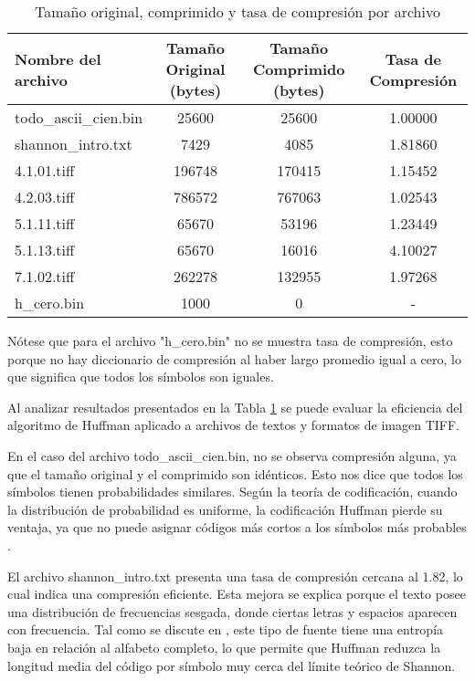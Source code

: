 \documentclass[conference,onecolumn,12pt]{IEEEtran}
\numberwithin{equation}{subsection}
\begin{document}
\begin{table}[H]
    \centering
    \caption{Tamaño original, comprimido y tasa de compresión por archivo}
    \label{tab:compression_stats}
    \begin{tabular}{lccc}
        \toprule
        \textbf{Nombre del archivo} & \textbf{Tamaño Original (bytes)} & \textbf{Tamaño Comprimido (bytes)} & \textbf{Tasa de Compresión} \\
        \midrule
        todo\_ascii\_cien.bin & 25600  & 25600  & 1.00000 \\
        shannon\_intro.txt    & 7429   & 4085   & 1.81860 \\
        4.1.01.tiff 		  & 196748 & 170415 & 1.15452 \\
        4.2.03.tiff 		  & 786572 & 767063 & 1.02543 \\
        5.1.11.tiff			  & 65670  & 53196  & 1.23449 \\
        5.1.13.tiff 	   	  & 65670  & 16016  & 4.10027 \\
        7.1.02.tiff 		  & 262278 & 132955 & 1.97268 \\
        h\_cero.bin 		  & 1000   & 0      & - \\
        \bottomrule 
    \end{tabular}
\end{table}

Nótese que para el archivo "h\_cero.bin" no se muestra tasa de compresión, esto porque no hay diccionario de compresión al haber largo promedio igual a cero, lo que significa que todos los símbolos son iguales.

Al analizar resultados presentados en la Tabla \ref{tab:compression_stats} se puede evaluar la eficiencia del algoritmo de Huffman aplicado a archivos de textos y formatos de imagen TIFF.

En el caso del archivo todo\_ascii\_cien.bin, no se observa compresión alguna, ya que el tamaño original y el comprimido son idénticos. Esto nos dice que todos los símbolos tienen probabilidades similares. Según la teoría de codificación, cuando la distribución de probabilidad es uniforme, la codificación Huffman pierde su ventaja, ya que no puede asignar códigos más cortos a los símbolos más probables \cite{haykin}.

El archivo shannon\_intro.txt presenta una tasa de compresión cercana al 1.82, lo cual indica una compresión eficiente. Esta mejora se explica porque el texto posee una distribución de frecuencias sesgada, donde ciertas letras y espacios aparecen con  frecuencia. Tal como se discute en \cite{haykin}, este tipo de fuente tiene una entropía baja en relación al alfabeto completo, lo que permite que Huffman reduzca la longitud media del código por símbolo muy cerca del límite teórico de Shannon.
\end{document}
